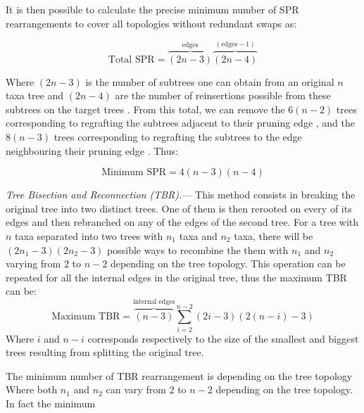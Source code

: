 \documentclass[12pt,letterpaper]{article}
\renewcommand{\subsubsection}[1]{%
\vspace{2ex}
\noindent
\textit{#1.}---}
\begin{document}
It is then possible to calculate the precise minimum number of SPR rearrangements to cover all topologies without redundant swaps as:

\begin{equation}
    \text{Total SPR}={\overbrace{(2n-3)}^{\text{edges}}} {\overbrace{(2n-4)}^{(\text{edges} - 1)}} %
\end{equation}

Where $(2n-3)$ is the number of subtrees one can obtain from an original $n$ taxa tree and $(2n-4)$ are the number of reinsertions possible from these subtrees on the target trees \cite{allen2001subtree}.
From this total, we can remove the $6(n-2)$ trees corresponding to regrafting the subtrees adjacent to their pruning edge \citep[resulting in the same topology; ][]{allen2001subtree}, and the $8(n-3)$ trees corresponding to regrafting the subtrees to the edge neighbouring their pruning edge \citep{allen2001subtree}.
Thus: 

\begin{equation}
    \text{Minimum SPR}=4(n-3)(n-4) %
\end{equation}

\citep[c.f.][]{felsenstein2004inferring}

\subsubsection{Tree Bisection and Reconnection (TBR)}
This method consists in breaking the original tree into two distinct trees.
One of them is then rerooted on every of its edges and then rebranched on any of the edges of the second tree.
For a tree with $n$ taxa separated into two trees with $n_{1}$ taxa and $n_{2}$ taxa, there will be $(2n_{1}-3)(2n_{2}-3)$ possible ways to recombine the them \citep{felsenstein2004inferring} with $n_{1}$ and $n_{2}$ varying from $2$ to $n-2$ depending on the tree topology.
This operation can be repeated for all the internal edges in the original tree, thus the maximum TBR can be:
\begin{equation}
    \text{Maximum TBR} = \overbrace{(n-3)}^{\text{internal edges}} \sum_{i=2}^{n-2} (2i-3)(2(n-i)-3) %
\end{equation}
Where $i$ and $n-i$ corresponds respectively to the size of the smallest and biggest trees resulting from splitting the original tree.

The minimum number of TBR rearrangement is depending on the tree topology
Where both $n_{1}$ and $n_{2}$ can vary from $2$ to $n-2$ depending on the tree topology.
In fact the minimum
\end{document}
